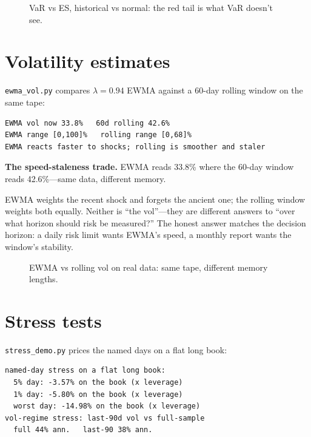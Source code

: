 \begin{figure}[htbp]\centering

\caption{VaR vs ES, historical vs normal: the red tail is what VaR doesn't see.}
\label{fig:var}
\end{figure}

\section{Volatility estimates}\label{sec:volet}

\texttt{ewma\_vol.py} compares $\lambda{=}0.94$ EWMA against a 60-day rolling window on
the same tape:
\begin{lstlisting}[numbers=none]
EWMA vol now 33.8%   60d rolling 42.6%
EWMA range [0,100]%   rolling range [0,68]%
EWMA reacts faster to shocks; rolling is smoother and staler
\end{lstlisting}

\begin{example}\label{ex:ewma}
\textbf{The speed-staleness trade.} EWMA reads 33.8\% where the 60-day window reads
42.6\%---same data, different memory.
\begin{solution}
EWMA weights the recent shock and forgets the ancient one; the rolling window weights
both equally. Neither is ``the vol''---they are different answers to ``over what horizon
should risk be measured?'' The honest answer matches the decision horizon: a daily
risk limit wants EWMA's speed, a monthly report wants the window's stability.
\end{solution}
\end{example}

\begin{figure}[htbp]\centering

\caption{EWMA vs rolling vol on real data: same tape, different memory lengths.}
\label{fig:ewma}
\end{figure}

\section{Stress tests}\label{sec:stress}

\texttt{stress\_demo.py} prices the named days on a flat long book:
\begin{lstlisting}[numbers=none]
named-day stress on a flat long book:
  5% day: -3.57% on the book (x leverage)
  1% day: -5.80% on the book (x leverage)
  worst day: -14.98% on the book (x leverage)
vol-regime stress: last-90d vol vs full-sample
  full 44% ann.   last-90 38% ann.
\end{lstlisting}

